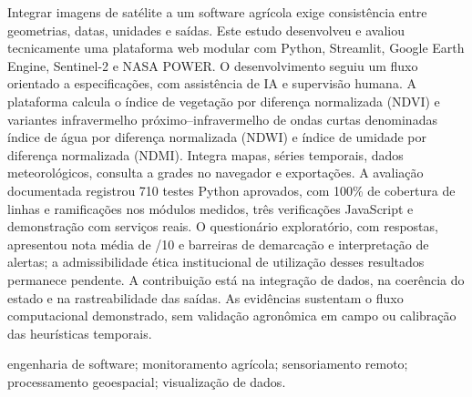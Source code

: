 \begin{resumo}
Integrar imagens de satélite a um software agrícola exige consistência entre geometrias, datas, unidades e saídas. Este estudo desenvolveu e avaliou tecnicamente uma plataforma web modular com Python, Streamlit, Google Earth Engine, Sentinel-2 e NASA POWER. O desenvolvimento seguiu um fluxo orientado a especificações, com assistência de IA e supervisão humana. A plataforma calcula o índice de vegetação por diferença normalizada (NDVI) e variantes infravermelho próximo--infravermelho de ondas curtas denominadas índice de água por diferença normalizada (NDWI) e índice de umidade por diferença normalizada (NDMI). Integra mapas, séries temporais, dados meteorológicos, consulta a grades no navegador e exportações. A avaliação documentada registrou 710 testes Python aprovados, com 100\% de cobertura de linhas e ramificações nos módulos medidos, três verificações JavaScript e demonstração com serviços reais. O questionário exploratório, com \UsuariosN{} respostas, apresentou nota média de \UsuariosMedia{}/10 e barreiras de demarcação e interpretação de alertas; a admissibilidade ética institucional de utilização desses resultados permanece pendente. A contribuição está na integração de dados, na coerência do estado e na rastreabilidade das saídas. As evidências sustentam o fluxo computacional demonstrado, sem validação agronômica em campo ou calibração das heurísticas temporais.
\end{resumo}
\begin{palavras_chave}
engenharia de software; monitoramento agrícola; sensoriamento remoto; processamento geoespacial; visualização de dados.
\end{palavras_chave}

